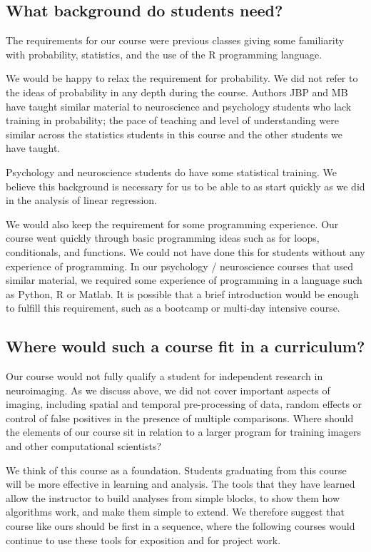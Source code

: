 \subsection{What background do students need?}

The requirements for our course were previous classes giving some familiarity
with probability, statistics, and the use of the R programming language.

We would be happy to relax the requirement for probability.  We did not refer
to the ideas of probability in any depth during the course.  Authors JBP and
MB have taught similar material to neuroscience and psychology students who
lack training in probability; the pace of teaching and level of understanding
were similar across the statistics students in this course and the other
students we have taught.

Psychology and neuroscience students do have some statistical training.  We
believe this background is necessary for us to be able to as start quickly as
we did in the analysis of linear regression.

We would also keep the requirement for some programming experience.  Our
course went quickly through basic programming ideas such as for loops,
conditionals, and functions.  We could not have done this for students without
any experience of programming.  In our psychology / neuroscience courses that
used similar material, we required some experience of programming in a
language such as Python, R or Matlab.  It is possible that a brief
introduction would be enough to fulfill this requirement, such as a bootcamp
or multi-day intensive course.

\subsection{Where would such a course fit in a curriculum?}

Our course would not fully qualify a student for independent research in
neuroimaging.  As we discuss above, we did not cover important aspects of
imaging, including spatial and temporal pre-processing of data, random effects
or control of false positives in the presence of multiple comparisons.  Where
should the elements of our course sit in relation to a larger program for
training imagers and other computational scientists?

We think of this course as a foundation.  Students graduating from this course
will be more effective in learning and analysis.  The tools that they have
learned allow the instructor to build analyses from simple blocks, to
show them how algorithms work, and make them simple to extend.  We therefore
suggest that course like ours should be first in a sequence, where the
following courses would continue to use these tools for exposition and for
project work.

